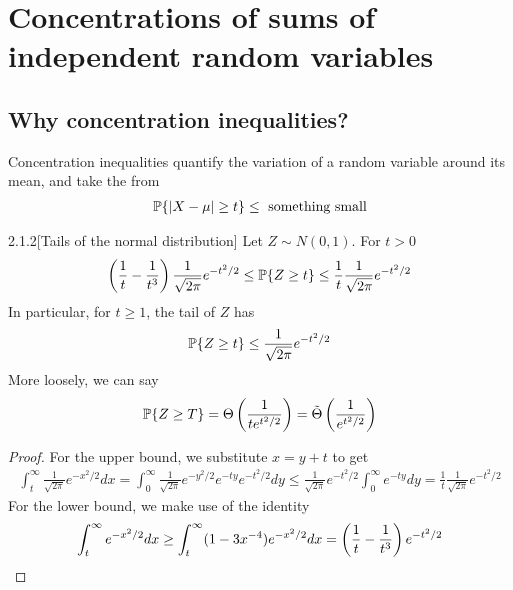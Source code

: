 
\section{Concentrations of sums of independent random variables}

\subsection{Why concentration inequalities?}

Concentration inequalities quantify the variation of a random variable around its mean, and take the from
\begin{align*}
    \P \{|X - \mu | \geq t\} \leq \text{ something small}
\end{align*}

\begin{prop}{2.1.2}[Tails of the normal distribution]\label{2.1.2}
Let $Z \sim N(0,1)$. For $t>0$
\begin{align*}
    \l( \frac 1 t - \frac1{t^3} \r) \frac 1 {\sqrt {2\pi}}e^{-t^2 / 2} \leq \P \{Z \geq t\} \leq \frac1t \frac 1 {\sqrt {2\pi}}e^{-t^2 / 2}
\end{align*}
In particular, for $t\geq 1$, the tail of $Z$ has
\begin{align*}
    \P \{Z \geq t\} \leq \frac 1 {\sqrt {2\pi}}e^{-t^2 / 2}
\end{align*}
More loosely, we can say 
\begin{align*}
\P \{Z \geq T\} = \Theta\l(\frac 1 {t e^{t^2/2}}\r) = \tilde{\Theta}\l(\frac 1 {e^{t^2 / 2}}\r)
\end{align*}
\end{prop}

\begin{proof}
For the upper bound, we substitute $x = y+t$ to get
\begin{align*}
    \int^\infty_t\frac 1 {\sqrt{2\pi}}e^{-x^2/2} dx = \int_0^\infty\frac1{\sqrt{2\pi}}e^{-y^2/2}e^{-ty}e^{-t^2/2} dy \leq \frac 1 {\sqrt{2\pi}}e^{-t^2/2}\int_0^\infty e^{-ty} dy = \frac1t \frac 1 {\sqrt {2\pi}}e^{-t^2 / 2}
\end{align*}
For the lower bound, we make use of the identity
\begin{align*}
    \int^\infty_t e^{-x^2/2}dx \geq \int^\infty_t (1-3x^{-4})e^{-x^2/2}dx = \l(\frac1t - \frac1{t^3}\r)e^{-t^2/2}
\end{align*}
\end{proof}

